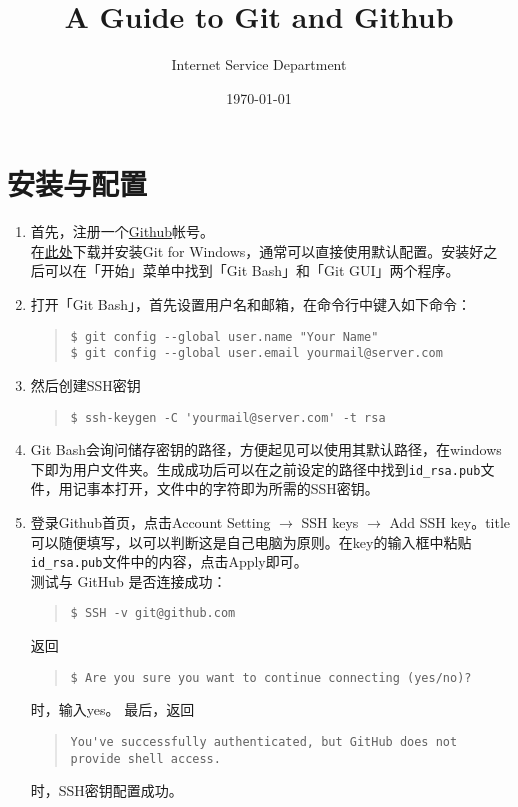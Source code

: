 \documentclass{article}
\title{A Guide to Git and Github}
\author{Internet Service Department}
\date{\today}
\begin{document}
	\maketitle
	\section{安装与配置} %
	\label{sec:安装与配置}
		\begin{enumerate}
			\item 首先，注册一个\href{http://github.com/}{Github}帐号。
			\\在\href{http://msysgit.github.io/}{此处}下载并安装Git for Windows，通常可以直接使用默认配置。安装好之后可以在「开始」菜单中找到「Git Bash」和「Git GUI」两个程序。
			\item 打开「Git Bash」，首先设置用户名和邮箱，在命令行中键入如下命令：
			\begin{quote}
				\begin{lstlisting}
$ git config --global user.name "Your Name"
$ git config --global user.email yourmail@server.com
				\end{lstlisting}
			\end{quote}
			\item 然后创建SSH密钥
			\begin{quote}
				\begin{lstlisting}
$ ssh-keygen -C 'yourmail@server.com' -t rsa
				\end{lstlisting}
			\end{quote}
			\item Git Bash会询问储存密钥的路径，方便起见可以使用其默认路径，在windows下即为用户文件夹。生成成功后可以在之前设定的路径中找到{\tt id\_rsa.pub}文件，用记事本打开，文件中的字符即为所需的SSH密钥。
			\item 登录Github首页，点击Account Setting $\to$ SSH keys $\to$ Add SSH key。title可以随便填写，以可以判断这是自己电脑为原则。在key的输入框中粘贴{\tt id\_rsa.pub}文件中的内容，点击Apply即可。
			\\测试与 GitHub 是否连接成功：
			\begin{quote}
				\begin{lstlisting}
$ SSH -v git@github.com
				\end{lstlisting}
			\end{quote}
			返回
			\begin{quote}
				\begin{lstlisting}
$ Are you sure you want to continue connecting (yes/no)?
				\end{lstlisting}
			\end{quote}
			时，输入yes。
			最后，返回
			\begin{quote}
				\begin{lstlisting}
You've successfully authenticated, but GitHub does not provide shell access.
				\end{lstlisting}
			\end{quote}
			时，SSH密钥配置成功。
		\end{enumerate}
\end{document}
